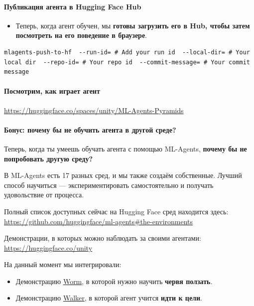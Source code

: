 \documentclass[11pt,a4paper]{article}
\begin{document}
\paragraph{Публикация агента в Hugging Face Hub}\label{push-the-agent-to-the-hugging-face-hub-1}

\begin{itemize}
\tightlist
\item
  Теперь, когда агент обучен, мы \textbf{готовы загрузить его в Hub, чтобы затем посмотреть на его поведение в браузере}.
\end{itemize}

\begin{lstlisting}
mlagents-push-to-hf  --run-id= # Add your run id  --local-dir= # Your local dir  --repo-id= # Your repo id  --commit-message= # Your commit message
\end{lstlisting}

\paragraph{Посмотрим, как играет агент}\label{watch-your-agent-playing-1}

\url{https://huggingface.co/spaces/unity/ML-Agents-Pyramids}

\paragraph{Бонус: почему бы не обучить агента в другой среде?}\label{bonus-why-not-train-on-another-environment}

Теперь, когда ты умеешь обучать агента с помощью ML-Agents, \textbf{почему бы не попробовать другую среду?}

В ML-Agents есть 17 разных сред, и мы также создаём собственные. Лучший способ научиться --- экспериментировать самостоятельно и получать удовольствие от процесса.


Полный список доступных сейчас на Hugging Face сред находится здесь: \url{https://github.com/huggingface/ml-agents#the-environments}

Демонстрации, в которых можно наблюдать за своими агентами: \url{https://huggingface.co/unity}

На данный момент мы интегрировали:

\begin{itemize}
\tightlist
\item
  Демонстрацию \href{https://huggingface.co/spaces/unity/ML-Agents-Worm}{Worm}, в которой нужно научить \textbf{червя ползать}.
\item
  Демонстрацию \href{https://huggingface.co/spaces/unity/ML-Agents-Walker}{Walker}, в которой агент учится \textbf{идти к цели}.
\end{itemize}
\end{document}
